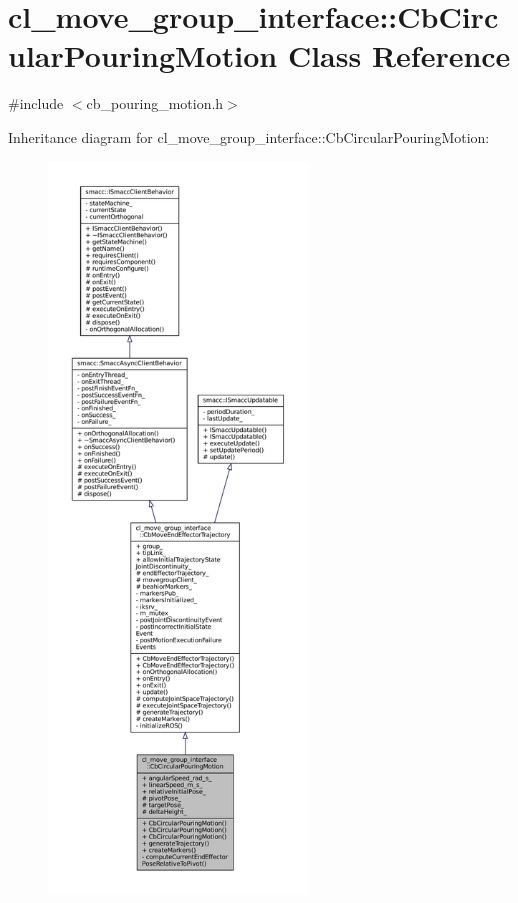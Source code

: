 \hypertarget{classcl__move__group__interface_1_1CbCircularPouringMotion}{}\section{cl\+\_\+move\+\_\+group\+\_\+interface\+:\+:Cb\+Circular\+Pouring\+Motion Class Reference}
\label{classcl__move__group__interface_1_1CbCircularPouringMotion}


{\ttfamily \#include $<$cb\+\_\+pouring\+\_\+motion.\+h$>$}



Inheritance diagram for cl\+\_\+move\+\_\+group\+\_\+interface\+:\+:Cb\+Circular\+Pouring\+Motion\+:
\nopagebreak
\begin{figure}[H]
\begin{center}
\leavevmode
\includegraphics[height=550pt]{classcl__move__group__interface_1_1CbCircularPouringMotion__inherit__graph}
\end{center}
\end{figure}


